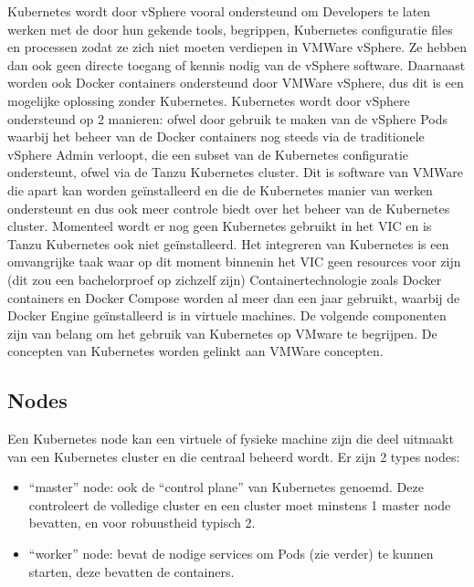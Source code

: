 \newline
\newline
Kubernetes wordt door vSphere vooral ondersteund om Developers te laten werken met de door hun gekende tools, begrippen, Kubernetes configuratie files en processen zodat ze zich niet moeten verdiepen in VMWare vSphere. Ze hebben dan ook geen directe toegang of kennis nodig van de vSphere software.\autocite{VMware2019}
\newline
\newline
Daarnaast worden ook Docker containers ondersteund door VMWare vSphere, dus dit is een mogelijke oplossing zonder Kubernetes.
\newline
\newline
Kubernetes wordt door vSphere ondersteund op 2 manieren: ofwel door gebruik te maken van de vSphere Pods waarbij het beheer van de Docker containers nog steeds via de traditionele vSphere Admin verloopt, die een subset van de Kubernetes configuratie ondersteunt, ofwel via de Tanzu Kubernetes cluster. Dit is software van VMWare die apart kan worden geïnstalleerd en die de Kubernetes manier van werken ondersteunt en dus ook meer controle biedt over het beheer van de Kubernetes cluster.
\newline
\newline
Momenteel wordt er nog geen Kubernetes gebruikt in het VIC en is Tanzu Kubernetes ook niet geïnstalleerd. Het integreren van Kubernetes is een omvangrijke taak waar op dit moment binnenin het VIC geen resources voor zijn (dit zou een bachelorproef op zichzelf zijn)
\newline
Containertechnologie zoals Docker containers en Docker Compose worden al meer dan een jaar gebruikt, waarbij de Docker Engine geïnstalleerd is in virtuele machines.
\newline
\newline
De volgende componenten zijn van belang om het gebruik van Kubernetes op VMware te begrijpen. De concepten van Kubernetes worden gelinkt aan VMWare concepten.
\newline
\newline
\subsection{Nodes}
Een Kubernetes node kan een virtuele of fysieke machine zijn die deel uitmaakt van een Kubernetes cluster en die centraal beheerd wordt.
Er zijn 2 types nodes:
\begin{itemize}
    \item ``master'' node: ook de ``control plane'' van Kubernetes genoemd. Deze controleert de volledige cluster en een cluster moet minstens 1 master node bevatten, en voor robuustheid typisch 2.
    \item ``worker'' node: bevat de nodige services om Pods (zie verder) te kunnen starten, deze bevatten de containers.
\end{itemize}
\autocite{NirShtein2023}
